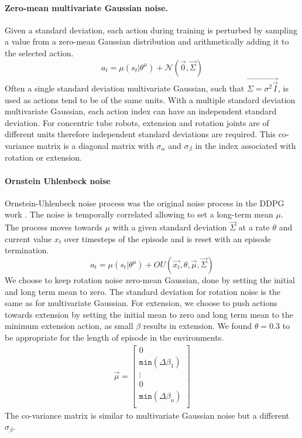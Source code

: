 \paragraph{Zero-mean multivariate Gaussian noise.}
Given a standard deviation, each action during training is perturbed by sampling a value from a zero-mean Gaussian distribution and arithmetically adding it to the selected action.
\begin{equation}
    a_t = \mu(s_t | \theta^\mu) + \mathcal{N} (\Vec{0}, \Vec{\Sigma}) \label{eqn:action-multivariate-gaussian}
\end{equation}
Often a single standard deviation multivariate Gaussian, such that $\Vec{\Sigma = \sigma^2 \Vec{I}}$, is used as actions tend to be of the same units. With a multiple standard deviation multivariate Gaussian, each action index can have an independent standard deviation. For concentric tube robots, extension and rotation joints are of different units therefore independent standard deviations are required. This co-variance matrix is a diagonal matrix with $\sigma_\alpha$ and $\sigma_\beta$ in the index associated with rotation or extension.

\paragraph{Ornstein Uhlenbeck noise}
Ornstein-Uhlenbeck noise process was the original noise process in the DDPG work  \cite{Lillicrap2015}. The noise is temporally correlated allowing to set a long-term mean $\mu$. The process moves towards $\mu$ with a given standard deviation $\Vec{\Sigma}$ at a rate $\theta$ and current value $x_t$ over timesteps of the episode and is reset with an episode termination.
\begin{equation}
    a_t = \mu(s_t | \theta^\mu) + OU \left( \Vec{x_{t}}, \theta, \Vec{\mu}, \Vec{\Sigma} \right) \label{eqn:action-ou}
\end{equation}
We choose to keep rotation noise zero-mean Gaussian, done by setting the initial and long term mean to zero. The standard deviation for rotation noise is the same as for multivariate Gaussian. For extension, we choose to push actions towards extension by setting the initial mean to zero and long term mean to the minimum extension action, as small $\beta$ results in extension. We found $\theta=0.3$ to be appropriate for the length of episode in the environments.
\begin{equation}
\begin{aligned}
\Vec{\mu} =
\left [
\begin{matrix}
0 \\
\texttt{min}(\Delta \beta_1) \\
\vdots \\
0 \\
\texttt{min}(\Delta \beta_n) \\
\end{matrix}
\right ]
\end{aligned} \label{eqn:mean-ou}
\end{equation}
The co-variance matrix is similar to multivariate Gaussian noise but a different $\sigma_\beta$.

